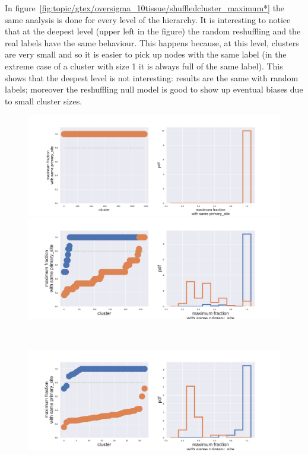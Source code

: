 \FloatBarrier
In figure~\ref{fig:topic/gtex/oversigma_10tissue/shuffledcluster_maximum*} the same analysis is done for every level of the hierarchy. It is interesting to notice that at the deepest level (upper left in the figure) the random reshuffling and the real labels have the same behaviour. This happens because, at this level, clusters are very small and so it is easier to pick up nodes with the same label (in the extreme case of a cluster with size 1 it is always full of the same label). This shows that the deepest level is not interesting: results are the same with random labels; moreover the reshuffling null model is good to show up eventual biases due to small cluster sizes.
\begin{figure}[htb!]
    \centering
    \begin{minipage}{0.45\textwidth}
    \includegraphics[width=0.9\linewidth]{pictures/topic/gtex/oversigma_10tissue/shuffledcluster_maximum_l0_primary_site.pdf}
    \end{minipage}
    \hspace{3mm}
    \begin{minipage}{0.45\textwidth}
    \includegraphics[width=0.9\linewidth]{pictures/topic/gtex/oversigma_10tissue/shuffledcluster_maximum_l1_primary_site.pdf}
    \end{minipage}
    \\
    \begin{minipage}{0.45\textwidth}
    \includegraphics[width=0.9\linewidth]{pictures/topic/gtex/oversigma_10tissue/shuffledcluster_maximum_l2_primary_site.pdf}

\end{minipage}
\end{figure}
